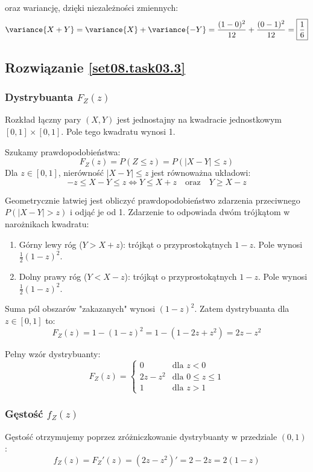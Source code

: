 oraz wariancję, dzięki niezależności zmiennych:
\[
	\variance{X+Y}
	= \variance{X} + \variance{-Y}
	= \frac{(1-0)^2}{12} + \frac{(0-1)^2}{12}
	= \boxed{\frac{1}{6}}
\]


\subsection*{Rozwiązanie \ref{set08.task03.3}}
\subsubsection*{Dystrybuanta \(F_Z(z)\)}
Rozkład łączny pary \((X, Y)\) jest jednostajny na kwadracie jednostkowym \([0, 1] \times [0, 1]\). Pole tego kwadratu wynosi 1.

Szukamy prawdopodobieństwa:
\[ F_Z(z) = P(Z \le z) = P(|X - Y| \le z) \]
Dla \(z \in [0, 1]\), nierówność \(|X - Y| \le z\) jest równoważna układowi:
\[ -z \le X - Y \le z \iff Y \le X + z \quad \text{oraz} \quad Y \ge X - z \]

Geometrycznie łatwiej jest obliczyć prawdopodobieństwo zdarzenia przeciwnego \(P(|X - Y| > z)\) i odjąć je od 1. Zdarzenie to odpowiada dwóm trójkątom w narożnikach kwadratu:
\begin{enumerate}
	\item Górny lewy róg (\(Y > X + z\)): trójkąt o przyprostokątnych \(1-z\). Pole wynosi \(\frac{1}{2}(1-z)^2\).
	\item Dolny prawy róg (\(Y < X - z\)): trójkąt o przyprostokątnych \(1-z\). Pole wynosi \(\frac{1}{2}(1-z)^2\).
\end{enumerate}

Suma pól obszarów "zakazanych" wynosi \((1-z)^2\). Zatem dystrybuanta dla \(z \in [0, 1]\) to:
\[ F_Z(z) = 1 - (1-z)^2 = 1 - (1 - 2z + z^2) = 2z - z^2 \]

Pełny wzór dystrybuanty:
\[
	F_Z(z) = \begin{cases}
		0        & \text{dla } z < 0         \\
		2z - z^2 & \text{dla } 0 \le z \le 1 \\
		1        & \text{dla } z > 1
	\end{cases}
\]

\subsubsection*{Gęstość \(f_Z(z)\)}
Gęstość otrzymujemy poprzez zróżniczkowanie dystrybuanty w przedziale \((0, 1)\):
\[ f_Z(z) = F_Z'(z) = (2z - z^2)' = 2 - 2z = 2(1-z) \]

